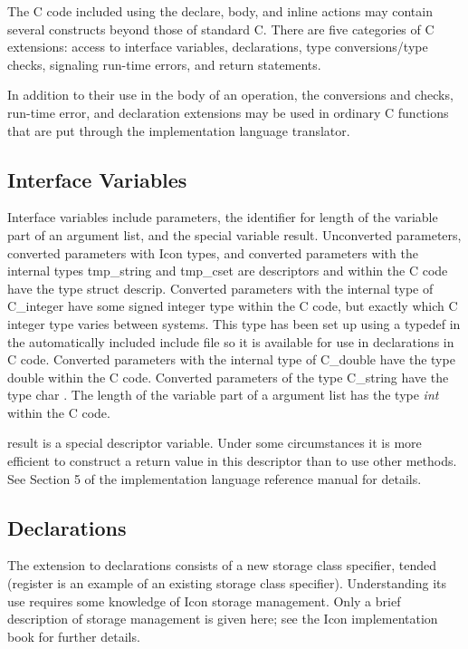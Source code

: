 The C code included using the declare, body, and inline actions may
contain several constructs beyond those of standard C. There are five
categories of C extensions: access to interface variables,
declarations, type conversions/type checks, signaling run-time errors,
and return statements.

In addition to their use in the body of an operation, the conversions
and checks, run-time error, and declaration extensions may be used in
ordinary C functions that are put through the implementation language
translator.

\subsection{Interface Variables}

Interface variables include parameters, the identifier for length of
the variable part of an argument list, and the special variable
result. Unconverted parameters, converted parameters with Icon types,
and converted parameters with the internal types tmp\_string and
tmp\_cset are descriptors and within the C code have the type struct
descrip.  Converted parameters with the internal type of C\_integer
have some signed integer type within the C code, but exactly which C
integer type varies between systems. This type has been set up using a
typedef in the automatically included include file so it is available
for use in declarations in C code. Converted parameters with the
internal type of C\_double have the type double within the C
code. Converted parameters of the type C\_string have the type char
. The length of the variable part of a argument list has the type
\textit{int} within the C code.

result is a special descriptor variable. Under some circumstances it
is more efficient to construct a return value in this descriptor than
to use other methods. See Section 5 of the implementation language
reference manual for details.

\subsection{Declarations}

The extension to declarations consists of a new storage class
specifier, tended (register is an example of an existing storage class
specifier). Understanding its use requires some knowledge of Icon
storage management. Only a brief description of storage management is
given here; see the Icon implementation book for further details.

